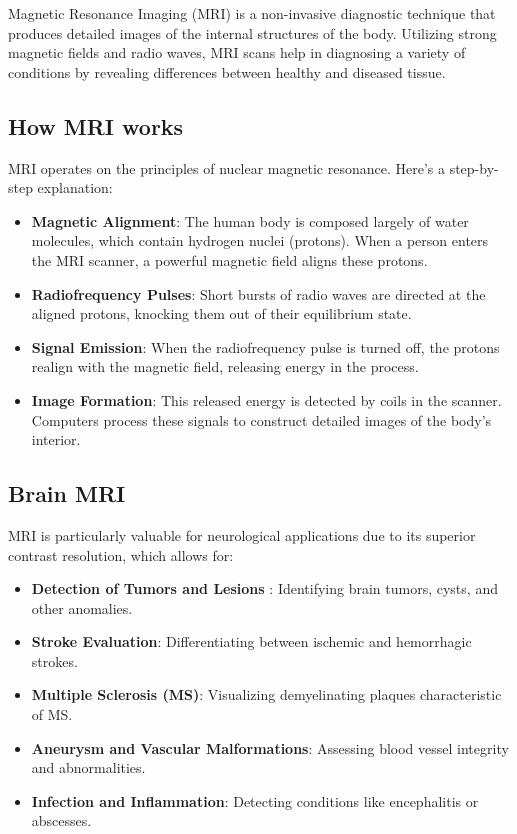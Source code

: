 \documentclass[hidelinks,12pt]{article}
\begin{document}
	Magnetic Resonance Imaging (MRI) is a non-invasive diagnostic technique that produces detailed images of the internal structures of the body. Utilizing strong magnetic fields and radio waves, MRI scans help in diagnosing a variety of conditions by revealing differences between healthy and diseased tissue.
	
	\subsection{How MRI works}
	
	MRI operates on the principles of nuclear magnetic resonance. Here's a step-by-step explanation:
	
	\begin{itemize}
		\item \textbf{Magnetic Alignment}: The human body is composed largely of water molecules, which contain hydrogen nuclei (protons). When a person enters the MRI scanner, a powerful magnetic field aligns these protons.
		\item \textbf{Radiofrequency Pulses}: Short bursts of radio waves are directed at the aligned protons, knocking them out of their equilibrium state.
		\item \textbf{Signal Emission}: When the radiofrequency pulse is turned off, the protons realign with the magnetic field, releasing energy in the process.
		\item \textbf{Image Formation}: This released energy is detected by coils in the scanner. Computers process these signals to construct detailed images of the body's interior.
	\end{itemize}
	
	
	\subsection{Brain MRI}
	MRI is particularly valuable for neurological applications due to its superior contrast resolution, which allows for:
	\begin{itemize}
		\item \textbf{Detection of Tumors and Lesions} : Identifying brain tumors, cysts, and other anomalies.
		\item \textbf{Stroke Evaluation}: Differentiating between ischemic and hemorrhagic strokes.
		\item \textbf{Multiple Sclerosis (MS)}: Visualizing demyelinating plaques characteristic of MS.
		\item \textbf{Aneurysm and Vascular Malformations}: Assessing blood vessel integrity and abnormalities.
		\item \textbf{Infection and Inflammation}: Detecting conditions like encephalitis or abscesses.
	\end{itemize}
	
\end{document}
